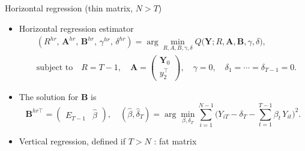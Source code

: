 \documentclass[xcolor=svgnames,aspectratio=169]{beamer}
\begin{document}
\begin{frame}{Horizontal regression (thin matrix, $N>T$)}
  \begin{itemize}
    \item Horizontal regression estimator
      \begin{align*}
        &(R^{hr},\,\mathbf{A}^{hr},\,\mathbf{B}^{hr},\,\gamma^{hr},\,\delta^{hr})
        = \arg\min_{R,A,B,\gamma,\delta}
           Q\bigl(\mathbf{Y};R,\mathbf{A},\mathbf{B},\gamma,\delta\bigr),\\
        &\text{subject to}\quad
        R = T-1,\quad
        \mathbf{A} = \begin{pmatrix}\mathbf{Y}_0 \\ y_2^\top\end{pmatrix},\quad
        \gamma = 0,\quad
        \delta_1 = \cdots = \delta_{T-1} = 0.
      \end{align*}
    \item The solution for $\mathbf{B}$ is
    \[
      \mathbf{B}^{hr\top}
      = \begin{pmatrix} E_{T-1} & \hat\beta \end{pmatrix},
      \quad
      (\hat\beta,\hat\delta_T)
      = \arg\min_{\beta,\delta_T}
        \sum_{i=1}^{N-1}
        \bigl(Y_{iT} - \delta_T - \sum_{t=1}^{T-1}\beta_t\,Y_{it}\bigr)^2.
    \]
  \end{itemize}
\end{frame}


\begin{frame}
    \begin{itemize}
        \item Vertical regression, defined if $T>N$ : fat matrix
    \end{itemize}
\end{frame}
\end{document}
